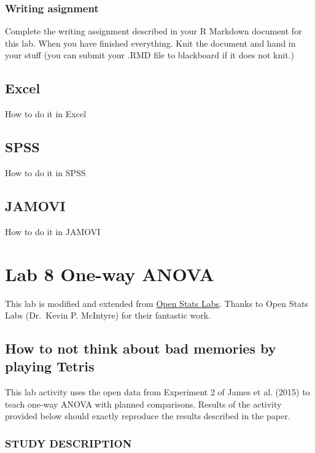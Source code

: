 \documentclass[]{book}
\theoremstyle{definition}
\theoremstyle{definition}
\theoremstyle{definition}
\theoremstyle{remark}
\begin{document}
\subsection{Writing asignment}\label{writing-asignment-4}

Complete the writing assignment described in your R Markdown document
for this lab. When you have finished everything. Knit the document and
hand in your stuff (you can submit your .RMD file to blackboard if it
does not knit.)

\section{Excel}\label{excel-6}

How to do it in Excel

\section{SPSS}\label{spss-6}

How to do it in SPSS

\section{JAMOVI}\label{jamovi-6}

How to do it in JAMOVI

\chapter{Lab 8 One-way ANOVA}\label{lab-8-one-way-anova}

This lab is modified and extended from
\href{https://sites.trinity.edu/osl}{Open Stats Labs}. Thanks to Open
Stats Labs (Dr.~Kevin P. McIntyre) for their fantastic work.

\section{How to not think about bad memories by playing
Tetris}\label{how-to-not-think-about-bad-memories-by-playing-tetris}

This lab activity uses the open data from Experiment 2 of James et al.
(2015) to teach one-way ANOVA with planned comparisons. Results of the
activity provided below should exactly reproduce the results described
in the paper.

\subsection{STUDY DESCRIPTION}\label{study-description-2}
\end{document}
